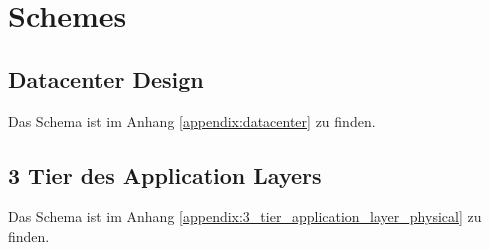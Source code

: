 \appendix

\section{Schemes}

\subsection{Datacenter Design}
Das Schema ist im Anhang \ref{appendix:datacenter} zu finden.

\subsection{3 Tier des Application Layers}
Das Schema ist im Anhang \ref{appendix:3_tier_application_layer_physical} zu finden.



\listoftables


\label{appendix:datacenter}


\label{appendix:3_tier_application_layer_physical}





%  
% 



